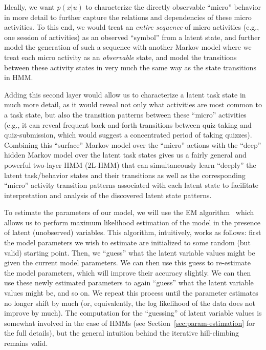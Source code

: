 Ideally, we want $p(x|u)$ to characterize the directly observable ``micro''
behavior in more detail to further capture the relations and dependencies
of these micro activities. To this end, we would treat an {\em entire
sequence} of micro activities (e.g., one session of activities) as an
observed ``symbol'' from a latent state, and further model the generation
of such a sequence with another Markov model where we treat each micro
activity as an {\em observable} state, and model the transitions between
these activity states in very much the same way as the state transitions in
HMM.

Adding this second layer would allow us to characterize a latent task
state in much more detail, as it would reveal not only what activities are
most common to a task state, but also the transition patterns between these
``micro'' activities (e.g., it can reveal frequent back-and-forth
transitions between quiz-taking and quiz-submission, which would suggest a
concentrated period of taking quizzes). Combining this ``surface'' Markov
model over the ``micro'' actions with the ``deep'' hidden Markov model over
the latent task states gives us a fairly general and powerful two-layer HMM
(2L-HMM) that can simultaneously learn ``deeply'' the latent task/behavior
states and their transitions as well as the corresponding ``micro''
activity transition patterns associated with each latent state to
facilitate interpretation and analysis of the discovered latent state
patterns.

To estimate the parameters of our model, we will use the EM
algorithm~\citep{Dempster:1977:JRSS} which allows us to perform maximum
likelihood estimation of the model in the presence of latent (unobserved)
variables. This algorithm, intuitively, works as follows: first the model
parameters we wish to estimate are initialized to some random (but valid)
starting point. Then, we ``guess'' what the latent variable values might
be given the current model parameters. We can then use this guess to
re-estimate the model parameters, which will improve their accuracy
slightly. We can then use these newly estimated parameters to again
``guess'' what the latent variable values might be, and so on. We repeat
this process until the parameter estimates no longer shift by much (or,
equivalently, the log likelihood of the data does not improve by much). The
computation for the ``guessing'' of latent variable values is somewhat
involved in the case of HMMs (see Section~\ref{sec:param-estimation} for
the full details), but the general intuition behind the iterative
hill-climbing remains valid.


